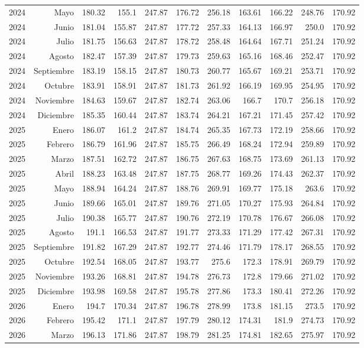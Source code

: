 \documentclass{article}%
\begin{document}
\begin{longtable}{|l r|r|r|r|r|r|r|r|r|r|}
2024&Mayo&180.32&155.1&247.87&176.72&256.18&163.61&166.22&248.76&170.92\\%
2024&Junio&181.04&155.87&247.87&177.72&257.33&164.13&166.97&250.0&170.92\\%
2024&Julio&181.75&156.63&247.87&178.72&258.48&164.64&167.71&251.24&170.92\\%
2024&Agosto&182.47&157.39&247.87&179.73&259.63&165.16&168.46&252.47&170.92\\%
2024&Septiembre&183.19&158.15&247.87&180.73&260.77&165.67&169.21&253.71&170.92\\%
2024&Octubre&183.91&158.91&247.87&181.73&261.92&166.19&169.95&254.95&170.92\\%
2024&Noviembre&184.63&159.67&247.87&182.74&263.06&166.7&170.7&256.18&170.92\\%
2024&Diciembre&185.35&160.44&247.87&183.74&264.21&167.21&171.45&257.42&170.92\\%
2025&Enero&186.07&161.2&247.87&184.74&265.35&167.73&172.19&258.66&170.92\\%
2025&Febrero&186.79&161.96&247.87&185.75&266.49&168.24&172.94&259.89&170.92\\%
2025&Marzo&187.51&162.72&247.87&186.75&267.63&168.75&173.69&261.13&170.92\\%
2025&Abril&188.23&163.48&247.87&187.75&268.77&169.26&174.43&262.37&170.92\\%
2025&Mayo&188.94&164.24&247.87&188.76&269.91&169.77&175.18&263.6&170.92\\%
2025&Junio&189.66&165.01&247.87&189.76&271.05&170.27&175.93&264.84&170.92\\%
2025&Julio&190.38&165.77&247.87&190.76&272.19&170.78&176.67&266.08&170.92\\%
2025&Agosto&191.1&166.53&247.87&191.77&273.33&171.29&177.42&267.31&170.92\\%
2025&Septiembre&191.82&167.29&247.87&192.77&274.46&171.79&178.17&268.55&170.92\\%
2025&Octubre&192.54&168.05&247.87&193.77&275.6&172.3&178.91&269.79&170.92\\%
2025&Noviembre&193.26&168.81&247.87&194.78&276.73&172.8&179.66&271.02&170.92\\%
2025&Diciembre&193.98&169.58&247.87&195.78&277.86&173.3&180.41&272.26&170.92\\%
2026&Enero&194.7&170.34&247.87&196.78&278.99&173.8&181.15&273.5&170.92\\%
2026&Febrero&195.42&171.1&247.87&197.79&280.12&174.31&181.9&274.73&170.92\\%
2026&Marzo&196.13&171.86&247.87&198.79&281.25&174.81&182.65&275.97&170.92\\%

\end{longtable}
\end{document}
